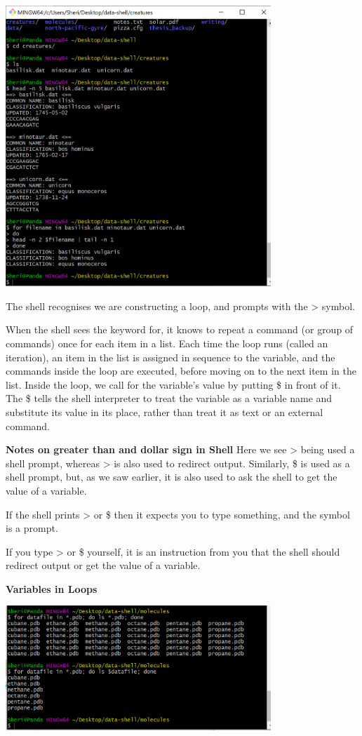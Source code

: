 \documentclass{article}
\begin{document}
\includegraphics[width=10cm]{Images/GitBash_043.PNG}

The shell recognises we are constructing a loop, and prompts with the \textgreater{} symbol.

When the shell sees the keyword for, it knows to repeat a command (or group of commands) once for each item in a list. Each time the loop runs (called an iteration), an item in the list is assigned in sequence to the variable, and the commands inside the loop are executed, before moving on to the next item in the list. Inside the loop, we call for the variable’s value by putting \$ in front of it. The \$ tells the shell interpreter to treat the variable as a variable name and substitute its value in its place, rather than treat it as text or an external command.

\textbf{Notes on  greater than and dollar sign in Shell}
\label{Error: Notes on  greater than and dollar sign in Shell}
Here we see > being used a shell prompt, whereas > is also used to redirect output. Similarly, \$ is used as a shell prompt, but, as we saw earlier, it is also used to ask the shell to get the value of a variable.

If the shell prints > or \$ then it expects you to type something, and the symbol is a prompt.

If you type > or \$ yourself, it is an instruction from you that the shell should redirect output or get the value of a variable.


\textbf{Variables in Loops}

\includegraphics[width=10cm]{Images/GitBash_044.PNG}
\end{document}
